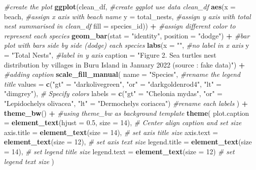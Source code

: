 \documentclass[
]{article}
\newenvironment{Shaded}{\begin{snugshade}}{\end{snugshade}}
\newcommand{\AttributeTok}[1]{\textcolor[rgb]{0.13,0.29,0.53}{#1}}
\newcommand{\CommentTok}[1]{\textcolor[rgb]{0.56,0.35,0.01}{\textit{#1}}}
\newcommand{\DecValTok}[1]{\textcolor[rgb]{0.00,0.00,0.81}{#1}}
\newcommand{\FloatTok}[1]{\textcolor[rgb]{0.00,0.00,0.81}{#1}}
\newcommand{\FunctionTok}[1]{\textcolor[rgb]{0.13,0.29,0.53}{\textbf{#1}}}
\newcommand{\NormalTok}[1]{#1}
\newcommand{\OtherTok}[1]{\textcolor[rgb]{0.56,0.35,0.01}{#1}}
\newcommand{\SpecialCharTok}[1]{\textcolor[rgb]{0.81,0.36,0.00}{\textbf{#1}}}
\newcommand{\StringTok}[1]{\textcolor[rgb]{0.31,0.60,0.02}{#1}}
\begin{document}
\begin{Shaded}
\begin{Highlighting}[]
\CommentTok{\#create the plot}
\FunctionTok{ggplot}\NormalTok{(clean\_df,                       }\CommentTok{\#create ggplot use data clean\_df }
       \FunctionTok{aes}\NormalTok{(}\AttributeTok{x =}\NormalTok{ beach,                  }\CommentTok{\#assign x axis with beach name}
           \AttributeTok{y =}\NormalTok{ total\_nests,            }\CommentTok{\#assign y axis with total nest summarised in clean\_df}
           \AttributeTok{fill =}\NormalTok{ species\_id)) }\SpecialCharTok{+}       \CommentTok{\#assign different color to represent each species}
  \FunctionTok{geom\_bar}\NormalTok{(}\AttributeTok{stat =} \StringTok{"identity"}\NormalTok{, }\AttributeTok{position =} \StringTok{"dodge"}\NormalTok{) }\SpecialCharTok{+}   \CommentTok{\#bar plot with bars side by side (dodge) each species}
  \FunctionTok{labs}\NormalTok{(}\AttributeTok{x =} \StringTok{""}\NormalTok{,            }\CommentTok{\#no label in x axis}
       \AttributeTok{y =} \StringTok{"Total Nests"}\NormalTok{, }\CommentTok{\#label in y axis}
       \AttributeTok{caption =} \StringTok{"Figure 2. Sea turtles nest distribution by villages in Buru Island in January 2022 (source : fake data)"}\NormalTok{) }\SpecialCharTok{+}  \CommentTok{\#adding caption}
  \FunctionTok{scale\_fill\_manual}\NormalTok{(}
    \AttributeTok{name =} \StringTok{"Species"}\NormalTok{,    }\CommentTok{\#rename the legend title}
    \AttributeTok{values =} \FunctionTok{c}\NormalTok{(}\StringTok{"gt"} \OtherTok{=} \StringTok{"darkolivegreen"}\NormalTok{, }\StringTok{"or"} \OtherTok{=} \StringTok{"darkgoldenrod4"}\NormalTok{, }\StringTok{"lt"} \OtherTok{=} \StringTok{"dimgrey"}\NormalTok{),  }\CommentTok{\# Specify colors}
    \AttributeTok{labels =} \FunctionTok{c}\NormalTok{(}\StringTok{"gt"} \OtherTok{=} \StringTok{"Chelonia mydas"}\NormalTok{, }\StringTok{"or"} \OtherTok{=} \StringTok{"Lepidochelys olivacea"}\NormalTok{, }\StringTok{"lt"} \OtherTok{=} \StringTok{"Dermochelys coriacea"}\NormalTok{) }\CommentTok{\#rename each labels}
\NormalTok{  ) }\SpecialCharTok{+}
  \FunctionTok{theme\_bw}\NormalTok{() }\SpecialCharTok{+}   \CommentTok{\#using theme\_bw as background template}
  \FunctionTok{theme}\NormalTok{(}
    \AttributeTok{plot.caption =} \FunctionTok{element\_text}\NormalTok{(}\AttributeTok{hjust =} \FloatTok{0.5}\NormalTok{, }\AttributeTok{size =} \DecValTok{14}\NormalTok{),  }\CommentTok{\# Center align caption and set size}
    \AttributeTok{axis.title =} \FunctionTok{element\_text}\NormalTok{(}\AttributeTok{size =} \DecValTok{14}\NormalTok{),   }\CommentTok{\# set axis title size}
    \AttributeTok{axis.text =} \FunctionTok{element\_text}\NormalTok{(}\AttributeTok{size =} \DecValTok{12}\NormalTok{),    }\CommentTok{\# set axis text size}
    \AttributeTok{legend.title =} \FunctionTok{element\_text}\NormalTok{(}\AttributeTok{size =} \DecValTok{14}\NormalTok{), }\CommentTok{\# set legend title size}
    \AttributeTok{legend.text =} \FunctionTok{element\_text}\NormalTok{(}\AttributeTok{size =} \DecValTok{12}\NormalTok{)   }\CommentTok{\# set legend text size}
\NormalTok{  )}
\end{Highlighting}
\end{Shaded}
\end{document}
